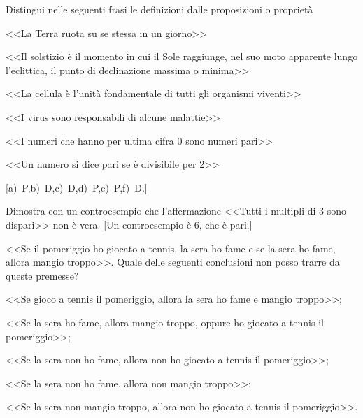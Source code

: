 \begin{esercizio}
\label{ese:1.18}
Distingui nelle seguenti frasi le definizioni dalle proposizioni o 
proprietà
\begin{enumeratea}
\item <<La Terra ruota su se stessa in un giorno>>		
			\hfill\boxD\quad\boxP
\item <<Il solstizio è il momento in cui il Sole raggiunge, nel suo 
moto apparente lungo l'eclittica, il punto di declinazione massima o 
minima>>			\hfill\boxD\quad\boxP
\item <<La cellula è l'unità fondamentale di tutti gli organismi 
viventi>>\hfill\boxD\quad\boxP
\item <<I virus sono responsabili di alcune 
malattie>>\hfill\boxD\quad\boxP
\item <<I numeri che hanno per ultima cifra 0 sono numeri 
pari>>\hfill\boxD\quad\boxP
\item <<Un numero si dice pari se è divisibile per 
2>>\hfill\boxD\quad\boxP
\end{enumeratea}
\hfill [a)~P,\quad b)~D,\quad c)~D,\quad d)~P,\quad e)~P,\quad f)~D.]
\end{esercizio}

\begin{esercizio}
\label{ese:1.19}
Dimostra con un controesempio che l'affermazione <<Tutti i multipli 
di 3 sono dispari>> non è vera.
\hfill [Un controesempio è 6, che è pari.]
\end{esercizio}


\begin{esercizio}
\label{ese:1.28}
<<Se il pomeriggio ho giocato a tennis, la sera ho fame e se la sera 
ho fame, allora mangio troppo>>. Quale delle seguenti conclusioni non 
posso trarre da queste premesse?
\begin{enumeratea}
\item <<Se gioco a tennis il pomeriggio, allora la sera ho fame e 
mangio troppo>>;
\item <<Se la sera ho fame, allora mangio troppo, oppure ho giocato a 
tennis il pomeriggio>>;
\item <<Se la sera non ho fame, allora non ho giocato a tennis il 
pomeriggio>>;
\item <<Se la sera non ho fame, allora non mangio troppo>>;
\item <<Se la sera non mangio troppo, allora non ho giocato a tennis 
il pomeriggio>>.
\end{enumeratea}
\end{esercizio}


